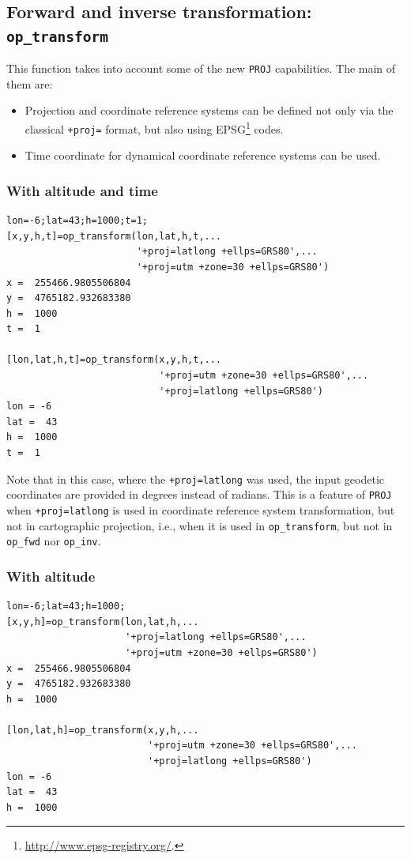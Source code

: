 \documentclass[10pt,a4paper]{article}
\newcommand{\proj}{\texttt{PROJ}}
\begin{document}
\subsection{Forward and inverse transformation: \texttt{op\_transform}}

This function takes into account some of the new \proj{} capabilities. The main
of them are:
\begin{itemize}
\item Projection and coordinate reference systems can be defined not only via
      the classical \texttt{+proj=} format, but also using
      EPSG\footnote{\url{http://www.epsg-registry.org/}.} codes.
\item Time coordinate for dynamical coordinate reference systems can be used.
\end{itemize}

\subsubsection{With altitude and time}

\begin{verbatim}
lon=-6;lat=43;h=1000;t=1;
[x,y,h,t]=op_transform(lon,lat,h,t,...
                       '+proj=latlong +ellps=GRS80',...
                       '+proj=utm +zone=30 +ellps=GRS80')
x =  255466.9805506804
y =  4765182.932683380
h =  1000
t =  1

[lon,lat,h,t]=op_transform(x,y,h,t,...
                           '+proj=utm +zone=30 +ellps=GRS80',...
                           '+proj=latlong +ellps=GRS80')
lon = -6
lat =  43
h =  1000
t =  1
\end{verbatim}

Note that in this case, where the \texttt{+proj=latlong} was used, the input
geodetic coordinates are provided in degrees instead of radians. This is a
feature of \proj{} when \texttt{+proj=latlong} is used in coordinate reference
system transformation, but not in cartographic projection, i.e., when it is used
in \texttt{op\_transform}, but not in \texttt{op\_fwd} nor  \texttt{op\_inv}.

\subsubsection{With altitude}

\begin{verbatim}
lon=-6;lat=43;h=1000;
[x,y,h]=op_transform(lon,lat,h,...
                     '+proj=latlong +ellps=GRS80',...
                     '+proj=utm +zone=30 +ellps=GRS80')
x =  255466.9805506804
y =  4765182.932683380
h =  1000

[lon,lat,h]=op_transform(x,y,h,...
                         '+proj=utm +zone=30 +ellps=GRS80',...
                         '+proj=latlong +ellps=GRS80')
lon = -6
lat =  43
h =  1000
\end{verbatim}
\end{document}
